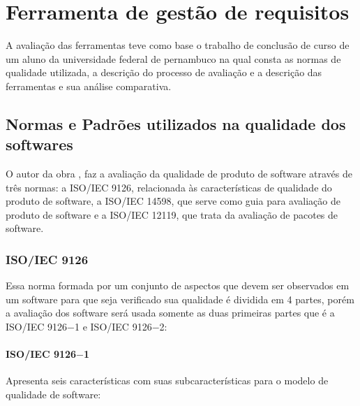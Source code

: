 \chapter{Ferramenta de gestão de requisitos}

  A avaliação das ferramentas teve como base o trabalho de conclusão de curso de um aluno da universidade federal de pernambuco
  na qual consta as normas de qualidade utilizada, a descrição do processo de avaliação e a descrição das ferramentas e sua
  análise comparativa.

\section{Normas e Padrões utilizados na qualidade dos softwares}

  O autor da obra \cite{rafael2009}, faz a avaliação da qualidade de produto de software através de três normas: a ISO/IEC 9126,
  relacionada às características de qualidade do produto de software, a ISO/IEC 14598, que serve como guia para avaliação de
  produto de software e a ISO/IEC 12119, que trata da avaliação de pacotes de software.

\subsection{ISO/IEC 9126}

  Essa norma formada por um conjunto de aspectos que devem ser observados em um software para que seja verificado sua qualidade é
  dividida em 4 partes, porém a avaliação dos software será usada somente as duas primeiras partes que é a ISO/IEC 9126$-$1 e
  ISO/IEC 9126$-$2:

\subsubsection{ISO/IEC 9126$-$1}

  Apresenta seis características com suas subcaracterísticas para o modelo de qualidade de software:

